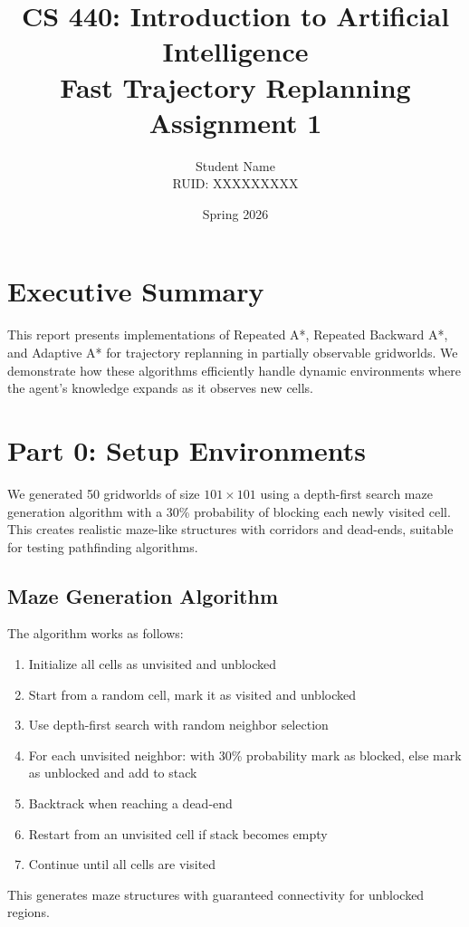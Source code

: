 \documentclass[12pt]{article}
\title{CS 440: Introduction to Artificial Intelligence\\
Fast Trajectory Replanning\\
Assignment 1}
\author{Student Name \\ RUID: XXXXXXXXX}
\date{Spring 2026}
\begin{document}
\maketitle

\section*{Executive Summary}

This report presents implementations of Repeated A*, Repeated Backward A*, and Adaptive A* 
for trajectory replanning in partially observable gridworlds. We demonstrate how these algorithms 
efficiently handle dynamic environments where the agent's knowledge expands as it observes new cells.

\section{Part 0: Setup Environments}

We generated 50 gridworlds of size $101 \times 101$ using a depth-first search maze generation 
algorithm with a 30\% probability of blocking each newly visited cell. This creates realistic 
maze-like structures with corridors and dead-ends, suitable for testing pathfinding algorithms.

\subsection{Maze Generation Algorithm}

The algorithm works as follows:
\begin{enumerate}
    \item Initialize all cells as unvisited and unblocked
    \item Start from a random cell, mark it as visited and unblocked
    \item Use depth-first search with random neighbor selection
    \item For each unvisited neighbor: with 30\% probability mark as blocked, else mark as 
          unblocked and add to stack
    \item Backtrack when reaching a dead-end
    \item Restart from an unvisited cell if stack becomes empty
    \item Continue until all cells are visited
\end{enumerate}

This generates maze structures with guaranteed connectivity for unblocked regions.
\end{document}
